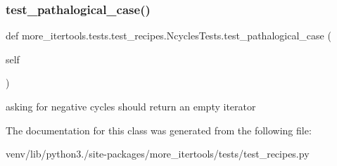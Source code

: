 \subsubsection{\texorpdfstring{test\+\_\+pathalogical\+\_\+case()}{test\_pathalogical\_case()}}
{\footnotesize\ttfamily def more\+\_\+itertools.\+tests.\+test\+\_\+recipes.\+Ncycles\+Tests.\+test\+\_\+pathalogical\+\_\+case (\begin{DoxyParamCaption}\item[{}]{self }\end{DoxyParamCaption})}

\begin{DoxyVerb}asking for negative cycles should return an empty iterator\end{DoxyVerb}
 

The documentation for this class was generated from the following file\+:\begin{DoxyCompactItemize}
\item 
venv/lib/python3./site-\/packages/more\+\_\+itertools/tests/test\+\_\+recipes.\+py\end{DoxyCompactItemize}
